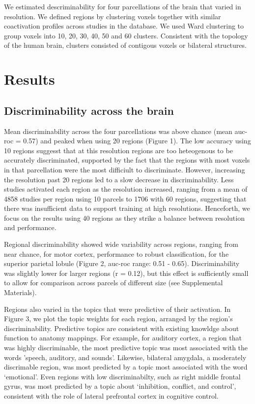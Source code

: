 We estimated descriminability for four parcellations of the brain that varied in resolution. We defined regions by clustering voxels together with similar coactivation profiles across studies in the database. We used Ward clustering to group voxels into 10, 20, 30, 40, 50 and 60 clusters. Consistent with the topology of the human brain, clusters consisted of contigous voxels or bilateral structures.

\chapter{Results}
\label{results}

\section{Discriminability across the brain}
\label{discriminabilityacrossthebrain}

Mean discriminability across the four parcellations was above chance (mean auc-roc = 0.57) and peaked when using 20 regions (Figure 1). The low accuracy using 10 regions suggesst that at this resolution regions are too heteogenous to be accurately discriminated, supported by the fact that the regions with most voxels in that parcellation were the most difficiult to discriminate. However, increasing the resolution past 20 regions led to a slow decrease in discriminability. Less studies activated each region as the resolution increased, ranging from a mean of 4858 studies per region using 10 parcels to 1706 with 60 regions, suggesting that there was insufficient data to support training at high resolutions. Henceforth, we focus on the results using 40 regions as they strike a balance between resolution and performance.

Regional discriminability showed wide variability across regions, ranging from near chance, for motor cortex, performance to robust classification, for the superior parietal lobule (Figure 2, auc-roc range: 0.51 - 0.65). Discriminability was slightly lower for larger regions (r = 0.12), but this effect is sufficiently small to allow for comparison across parcels of different size (see Supplemental Materials). 

Regions also varied in the topics that were predictive of their activation. In Figure 3, we plot the topic weights for each region, arranged by the region’s discriminability. Predictive topics are consistent with existing knowldge about function to anatomy mappings. For example, for auditory cortex, a region that was highly discriminable, the most predictive topic was most associated with the words ’speech, auditory, and sounds’. Likewise, bilateral amygdala, a moderately discrimable region, was most predicted by a topic most associated with the word ‘emotional’. Even regions with low discriminabilty, such as right middle frontal gyrus, was most predicted by a topic about ‘inhibition, conflict, and control’, consistent with the role of lateral prefrontal cortex in cognitive control.

